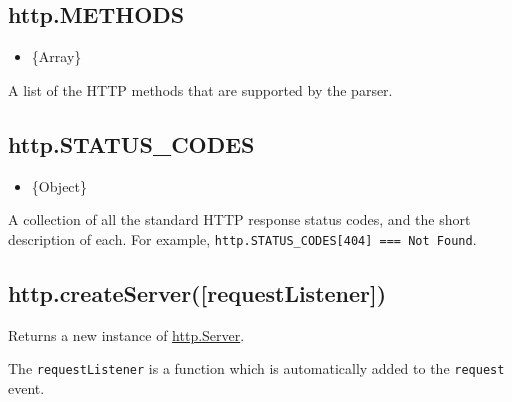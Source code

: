 \begin{Shaded}
\begin{Highlighting}[]
\NormalTok{[ }\NormalTok{, }\NormalTok{,}
  \NormalTok{, }\NormalTok{,}
  \NormalTok{, }\NormalTok{,}
  \NormalTok{, }\NormalTok{,}
  \NormalTok{, }\NormalTok{,}
  \NormalTok{, } \NormalTok{]}
\end{Highlighting}
\end{Shaded}

\subsection{http.METHODS}\label{http.methods}

\begin{itemize}
\itemsep1pt\parskip0pt
\item
  \{Array\}
\end{itemize}

A list of the HTTP methods that are supported by the parser.

\subsection{http.STATUS\_CODES}\label{http.statusux5fcodes}

\begin{itemize}
\itemsep1pt\parskip0pt
\item
  \{Object\}
\end{itemize}

A collection of all the standard HTTP response status codes, and the
short description of each. For example,
\texttt{http.STATUS\_CODES{[}404{]}\ ===\ \textquotesingle{}Not\ Found\textquotesingle{}}.

\subsection{http.createServer({[}requestListener{]})}\label{http.createserverrequestlistener}

Returns a new instance of
\hyperref[httpux5fclassux5fhttpux5fserver]{http.Server}.

The \texttt{requestListener} is a function which is automatically added
to the \texttt{\textquotesingle{}request\textquotesingle{}} event.


